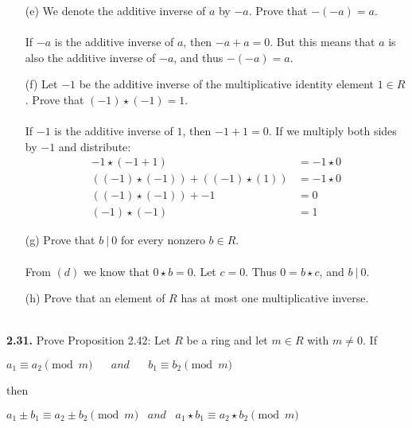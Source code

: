 \documentclass[11pt,fleqn]{article}
\begin{document}
\begin{itemize}
  
\item[(e)] We denote the additive inverse of $a$ by $-a$.  Prove that $-(-a) = a$.\\
  \\
If $-a$ is the additive inverse of $a$, then $-a + a = 0$.  But this means that $a$ is also the additive inverse of $-a$, and thus $-(-a) = a$.
  
\item[(f)] Let $-1$ be the additive inverse of the multiplicative identity element $1 \in R$.  Prove that $(-1) \star (-1) = 1$.\\
  \\
If $-1$ is the additive inverse of $1$, then $-1 + 1 = 0$.  If we multiply both sides by $-1$ and distribute:
\begin{align}
  -1 \star (-1 + 1) &= -1 \star 0\nonumber\\
  ((-1) \star (-1)) + ((-1) \star (1)) &= -1 \star 0\nonumber\\
  ((-1) \star (-1)) + -1 &= 0\nonumber\\
  (-1) \star (-1) &= 1\nonumber
\end{align}
  
\item[(g)] Prove that $b\:|\:0$ for every nonzero $b \in R$.\\
  \\
  From $(d)$ we know that $0 \star b = 0$.  Let $c = 0$.  Thus $0 = b \star c$, and $b\:|\:0$.
  
\item[(h)] Prove that an element of $R$ has at most one multiplicative inverse.\\
  \\
  
\end{itemize}

\begin{flushleft}
\textbf{2.31.} Prove Proposition 2.42: Let $R$ be a ring and let $m \in R$ with $m \neq 0$. If\\
\begin{center}
$a_1 \equiv a_2 \pmod{m} \;\;\; \;\;\; and \;\;\;\;\;\; b_1 \equiv b_2 \pmod{m}$
\end{center}
then\\
\begin{center}
$a_1 \pm b_1 \equiv a_2 \pm b_2 \pmod{m} \;\;\;and\;\;\; a_1 \star b_1 \equiv a_2 \star b_2 \pmod{m}$
\end{center}

\end{flushleft}
\end{document}
